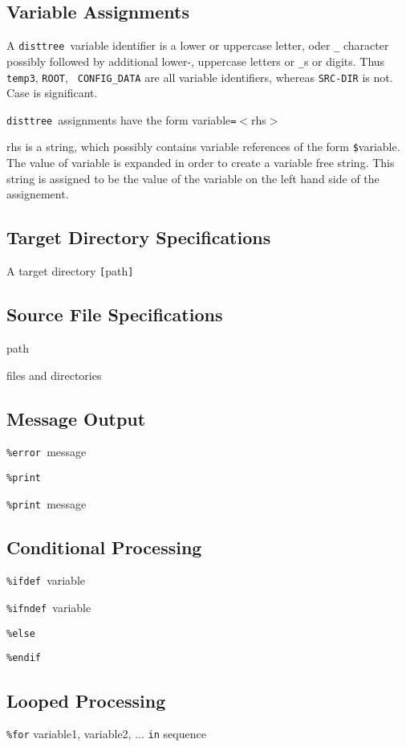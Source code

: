 \documentclass{article}
\newcommand{\disttree}{{\tt disttree}}
\begin{document}
\subsection{Variable Assignments}
A \disttree\ variable identifier is a lower or uppercase letter, oder
{\tt \_} character possibly followed by additional lower-, uppercase
letters or {\tt \_}s or digits. Thus {\tt temp3}, {\tt ROOT}, {\tt
  CONFIG\_DATA} are all variable identifiers, whereas {\tt SRC-DIR} is
not. Case is significant.

\disttree\ assignments have the form variable{\tt =}$<$rhs$>$


rhs is a string, which possibly contains variable references of the
form {\tt \$}variable. The value of variable is expanded in order
to create a variable free string. This string is assigned to be the
value of the variable on the left hand side of the assignement.


\subsection{Target Directory Specifications}
A target directory {\tt [}path{\tt ]}

\subsection{Source File Specifications}
path

files and directories

\subsection{Message Output}
{\tt \%error }message

{\tt \%print }

{\tt \%print }message


\subsection{Conditional Processing}
{\tt \%ifdef }variable

{\tt \%ifndef }variable

{\tt \%else}

{\tt \%endif}


\subsection{Looped Processing}

{\tt \%for} variable1, variable2, ... {\tt in} sequence
\end{document}
